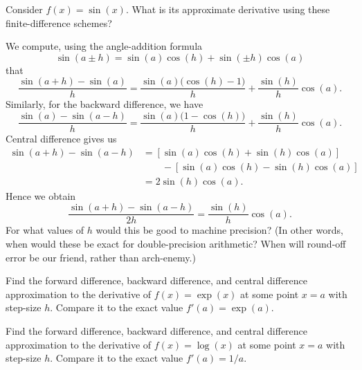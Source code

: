 \begin{ex}
  Consider $f(x)=\sin(x)$. What is its approximate derivative using
  these finite-difference schemes?

  We compute, using the angle-addition formula
  \begin{equation}
    \sin(a\pm h) = \sin(a)\cos(h)+\sin(\pm h)\cos(a)
  \end{equation}
  that
  \begin{equation}
    \frac{\sin(a+h)-\sin(a)}{h} = \frac{\sin(a)\bigl(\cos(h)-1\bigr)}{h}
    + \frac{\sin(h)}{h}\cos(a).
  \end{equation}
  Similarly, for the backward difference, we have
  \begin{equation}
    \frac{\sin(a)-\sin(a-h)}{h} = \frac{\sin(a)\bigl(1-\cos(h)\bigr)}{h}
    + \frac{\sin(h)}{h}\cos(a).
  \end{equation}
  Central difference gives us
  \begin{equation}
    \begin{split}
      \sin(a+h)-\sin(a-h) &= [\sin(a)\cos(h) +\sin(h)\cos(a)]\\
      &\qquad-[\sin(a)\cos(h)-\sin(h)\cos(a)]\\
    &= 2\sin(h)\cos(a).
    \end{split}
  \end{equation}
  Hence we obtain
  \begin{equation}
    \frac{\sin(a+h)-\sin(a-h)}{2h} = \frac{\sin(h)}{h}\cos(a).
  \end{equation}
  For what values of $h$ would this be good to machine precision? (In
  other words, when would these be exact for double-precision
  arithmetic? When will round-off error be our friend, rather than arch-enemy.)
\end{ex}

\begin{xca}
  Find the forward difference, backward difference, and central
  difference approximation to the derivative of $f(x)=\exp(x)$ at some
  point $x=a$ with step-size $h$. Compare it to the exact value $f'(a)=\exp(a)$.
\end{xca}

\begin{xca}
  Find the forward difference, backward difference, and central
  difference approximation to the derivative of $f(x)=\log(x)$ at some
  point $x=a$ with step-size $h$. Compare it to the exact value $f'(a)=1/a$.
\end{xca}


